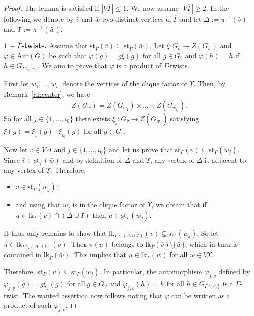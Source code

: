\documentclass[a4paper,english,11pt]{article}
\theoremstyle{definition}
\theoremstyle{remark}
\newcommand{\st}{\mathrm{st}}
\newcommand{\lk}{\mathrm{lk}}
\newcommand{\Aut}{\mathrm{Aut}}
\newcommand{\twistor}{\xi}
\begin{document}
\begin{proof} 
The lemma is satisfied if $|{V\overline\Gamma}|\le 1$. We now assume $|{V\overline\Gamma}|\geq 2$. In the following we denote by $\bar{v}$ and $\bar{w}$ two distinct vertices of $\overline{\Gamma}$ and let $\Delta:=\pi^{-1}(\bar{v})$ and $\Upsilon:=\pi^{-1}(\bar{w})$.

\medskip

\textbf{1 – $\overline{\Gamma}$-twists.} Assume that $\st_{\overline{\Gamma}}(\bar{v})\subseteq \st_{\overline{\Gamma}}(\bar{w})$. Let $\twistor:G_{\bar{v}}\rightarrow Z(G_{\bar{w}})$ and $\varphi\in \Aut(G)$ be such that $\varphi(g)= g\twistor(g)$ for all $g\in G_{\bar{v}}$ and $\varphi(h)=h$ if $h\in G_{\overline{\Gamma}\backslash \{\bar{v}\}}$. We aim to prove that $\varphi$ is a product of $\Gamma$-twists.

First let $w_1,\dots,w_{i_0}$ denote the vertices of the clique factor of $\Upsilon$. 
Then, by Remark~\ref{rk:center}, we have 
\begin{equation*}
    Z\left(G_{\bar{w}} \right)
    =Z\left( G_{w_1}\right)\times \dots \times Z\left( G_{w_{i_0}}\right).
\end{equation*}
So for all $j\in \{1,\dots,i_0\}$ there exists $\twistor_j:G_{\bar{v}}\rightarrow Z\left( G_{w_j}\right)$ satisfying $ \twistor(g)=\twistor_1(g)\cdots \twistor_{i_0}(g)$ for all $g\in G_{\bar v}$.

Now let $v\in V \Delta$ and $j\in \{1,\dots,i_0\}$ and let us prove that $\st_\Gamma(v)\subseteq \st_\Gamma(w_j)$. Since $\bar{v}\in \st_{\overline{\Gamma}}(\bar{w})$ and by definition of $\Delta$ and $\Upsilon$, any vertex of $\Delta$ is adjacent to any vertex of $\Upsilon$. Therefore,
\begin{itemize}
    \item $v\in \st_\Gamma(w_j)$;
    \item and using that $w_j$ is in the clique factor of $\Upsilon$, we obtain that if $u\in \lk_\Gamma(v)\cap (\Delta\cup \Upsilon)$ then $u\in \st_\Gamma(w_j)$.
\end{itemize}
It thus only remains to show that $\lk_{\Gamma \backslash(\Delta\cup \Upsilon)}(v)\subseteq \st_\Gamma(w_j)$. So let $u\in \lk_{\Gamma \backslash(\Delta\cup \Upsilon)}(v)$. Then $\pi(u)$ belongs to $\lk_{\overline{\Gamma}}(\bar{v})\setminus\{\bar w\}$, which in turn is contained in $\lk_{\overline{\Gamma}}(\bar{w})$. This implies that $u\in \lk_\Gamma(w)$ for all $w\in V\Upsilon$. 

Therefore, $\st_\Gamma(v)\subseteq \st_\Gamma(w_j)$. 
In particular, the automorphism $\varphi_{j,v}$ defined by $\varphi_{j,v}(g)=g\twistor_j(g)$ for all $g\in G_v$ and $\varphi_{j,v}(h)=h$ for all $h\in G_{\Gamma\backslash \{v\}}$ is a $\Gamma$-twist. The wanted assertion now follows noting that $\varphi$ can be written as a product of such $\varphi_{j,v}$.
\medskip


\end{proof}
\end{document}

